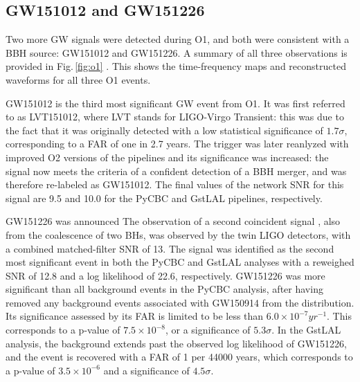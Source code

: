 \documentclass[binding=0.6cm, LaM]{sapthesis}
\begin{document}
\subsection{GW151012 and GW151226}

Two more GW signals were detected during O1, and both were consistent with a BBH source: GW151012 and GW151226.  A summary of all three observations is provided in Fig.\,\ref{fig:o1} \cite{193}.  This shows the time-frequency maps and reconstructed waveforms for all three O1 events.

	GW151012 is the third most significant GW event from O1.  It was first referred to as LVT151012, where LVT stands for LIGO-Virgo Transient: this was due to the fact that it
	was originally detected with a low statistical significance of $1.7\sigma$, 
	corresponding to a FAR of one in 2.7 years.  The trigger was later reanlyzed with improved O2 versions of the pipelines and its significance was increased: the signal now meets the criteria of a confident detection of a BBH merger, and was therefore re-labeled as GW151012.  The final values of the network SNR for this signal are 9.5 and 10.0 for the PyCBC and GstLAL pipelines, respectively.

	GW151226 was announced The observation of a second coincident signal , also from the coalescence of two BHs, 
	was observed by the twin LIGO detectors, with a combined matched-filter SNR of 13. 
	The signal was identified as the second most significant event in both the PyCBC and GstLAL analyses 
	with a reweighed SNR of 12.8 and a log likelihood of 22.6, respectively. 
	GW151226 was more significant than all background events in the PyCBC analysis, 
	after having removed any background events associated with GW150914 from the distribution. \\
	Its significance assessed by its FAR is limited to be less than $6.0 \times 10^{-7} yr^{-1}$. 
	This corresponds to a p-value of $7.5 \times 10^{-8}$, or a significance of $5.3\sigma$. 
	In the GstLAL analysis, the background extends past the observed log likelihood of GW151226, 
	and the event is recovered with a FAR of 1 per 44000 years, which corresponds to a p-value of $3.5\times 10^{-6}$ and a significance of $4.5\sigma$.
\end{document}
